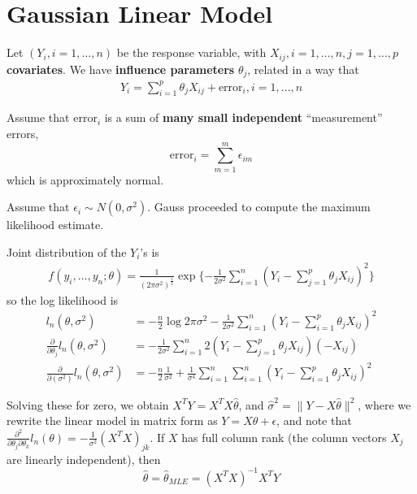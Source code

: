 
\chapter{Gaussian Linear Model}
\label{cha:gauss-line-model}

Let $(Y_{i}, i = 1, \dots, n)$ be the response variable, with $X_{ij},
i = 1, \dots, n, j = 1, \dots, p$ \textbf{covariates}. We have
\textbf{influence parameters} $\theta_{j}$, related in a way that
\begin{align}
  \label{eq:100}
  Y_{i} = \sum_{i=1}^{p} \theta_{j} X_{ij} + \text{error}_{i}, i = 1,
  \dots, n
\end{align}

Assume that $\text{error}_{i}$ is a sum of \textbf{many small
  independent} ``measurement'' errors,
\begin{equation}
  \label{eq:100}
  \text{error}_{i} = \sum_{m=1}^{m} \epsilon_{im} 
\end{equation} which is approximately normal.

Assume that $\epsilon_{i} \sim N(0, \sigma^{2})$. Gauss proceeded to
compute the maximum likelihood estimate.

\begin{proposition}
  Joint distribution of the $Y_{i}$'s is
  \begin{align}
    \label{eq:100}
    f(y_{i}, \dots, y_{n}; \theta) = \frac{1}{(2 \pi
      \sigma^{2})^{\frac{1}{2}}} \exp \{ - \frac{1}{2 \sigma^{2}}
    \sum_{i=1}^{n} (Y_{i} - \sum_{j=1}^{p} \theta_{j} X_{ij})^{2} \}
  \end{align} so the log likelihood is
  \begin{align}
    \label{eq:100}
    l_{n}(\theta, \sigma^{2}) &= -\frac{n}{2} \log 2 \pi \sigma^{2} -
    \frac{1}{2 \sigma^{2}} \sum_{i=1}^{n}(Y_{i}  - \sum_{i=1}^{p}
    \theta_{j} X_{ij})^{2} \\
    \frac{\partial}{\partial \theta_{j}} l_{n}(\theta, \sigma^{2}) &= -
    \frac{1}{2 \sigma^{2}} \sum_{i=1}^{n} 2(Y_{i} - \sum_{j=1}^{p}
    \theta_{j} X_{ij})(-X_{ij}) \\
    \frac{\partial}{\partial (\sigma^{2})} l_{n}(\theta, \sigma^{2}) &=
    - \frac{n}{2} \frac{1}{\sigma^{2}} + \frac{1}{\sigma^{4}}
    \sum_{i=1}^{n} \sum_{i=1}^{n} (Y_{i} - \sum_{i=1}^{p} \theta_{j} X_{ij})^{2}
  \end{align}

  Solving these for zero, we obtain $X^{T} Y = X^{T} X \hat \theta$,
  and $\hat \sigma^{2} = \| Y - X \hat \theta \|^{2}$, where we
  rewrite the linear model in matrix form as $Y = X \theta +
  \epsilon$, and note that $\frac{\partial^{2}}{\partial
    \theta_{j} \partial \theta_{k}} l_{n}(\theta) = -
  \frac{1}{\sigma^{2}} (X^{T} X)_{jk}$.  If $X$ has full column rank
  (the column vectors $X_{j}$ are linearly independent), then
  \begin{equation}
    \label{eq:100}
    \hat \theta = \hat \theta_{MLE} = (X^{T} X)^{-1} X^{T} Y
  \end{equation}
\end{proposition}

